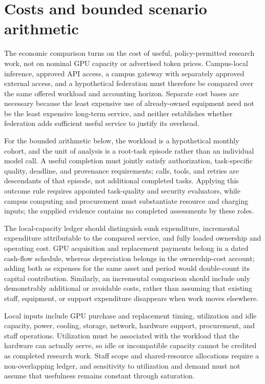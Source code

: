 \documentclass[11pt]{article}
\begin{document}
\section{Costs and bounded scenario arithmetic}
The economic comparison turns on the cost of useful, policy-permitted research work, not on nominal GPU capacity or advertised token prices. Campus-local inference, approved API access, a campus gateway with separately approved external access, and a hypothetical federation must therefore be compared over the same offered workload and accounting horizon. Separate cost bases are necessary because the least expensive use of already-owned equipment need not be the least expensive long-term service, and neither establishes whether federation adds sufficient useful service to justify its overhead.

For the bounded arithmetic below, the workload is a hypothetical monthly cohort, and the unit of analysis is a root-task episode rather than an individual model call. A useful completion must jointly satisfy authorization, task-specific quality, deadline, and provenance requirements; calls, tools, and retries are descendants of that episode, not additional completed tasks. Applying this outcome rule requires appointed task-quality and security evaluators, while campus computing and procurement must substantiate resource and charging inputs; the supplied evidence contains no completed assessments by these roles.

The local-capacity ledger should distinguish sunk expenditure, incremental expenditure attributable to the compared service, and fully loaded ownership and operating cost. GPU acquisition and replacement payments belong in a dated cash-flow schedule, whereas depreciation belongs in the ownership-cost account; adding both as expenses for the same asset and period would double-count its capital contribution. Similarly, an incremental comparison should include only demonstrably additional or avoidable costs, rather than assuming that existing staff, equipment, or support expenditure disappears when work moves elsewhere.

Local inputs include GPU purchase and replacement timing, utilization and idle capacity, power, cooling, storage, network, hardware support, procurement, and staff operations. Utilization must be associated with the workload that the hardware can actually serve, so idle or incompatible capacity cannot be credited as completed research work. Staff scope and shared-resource allocations require a non-overlapping ledger, and sensitivity to utilization and demand must not assume that usefulness remains constant through saturation.
\end{document}
